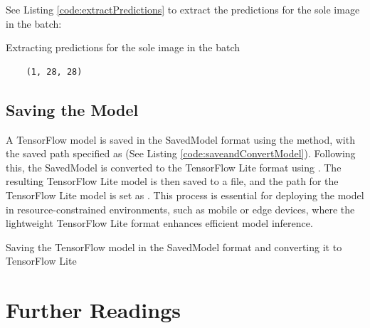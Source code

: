 See Listing \ref{code:extractPredictions} to extract the predictions for the sole image in the batch:

\begin{code}[h!]
	    
	
	\caption{Extracting predictions for the sole image in the batch}
	\label{code:extractPredictions}
\end{code}

\begin{verbatim}
	(1, 28, 28)
\end{verbatim}

\subsection{Saving the Model}

A TensorFlow model is saved in the SavedModel format using the  method, with the saved path specified as  (See Listing \ref{code:saveandConvertModel}). Following this, the SavedModel is converted to the TensorFlow Lite format using . The resulting TensorFlow Lite model is then saved to a file, and the path for the TensorFlow Lite model is set as . This process is essential for deploying the model in resource-constrained environments, such as mobile or edge devices, where the lightweight TensorFlow Lite format enhances efficient model inference.

\begin{code}[h!]
	    
	
	\caption{Saving the TensorFlow model in the SavedModel format and converting it to TensorFlow Lite}
	\label{code:saveandConvertModel}
\end{code}


\section{Further Readings}

